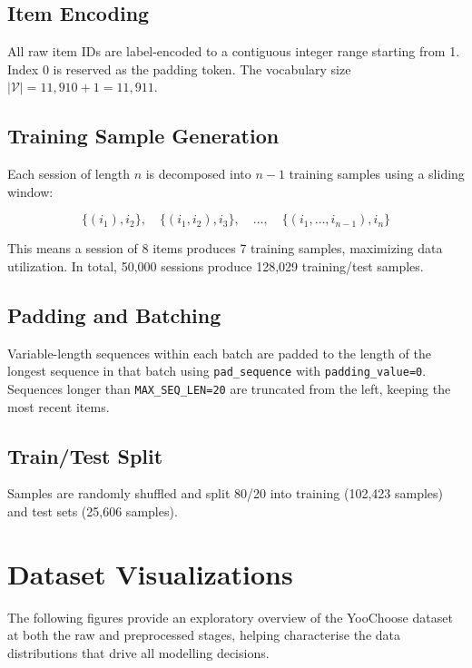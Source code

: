 \documentclass[12pt,a4paper]{report}
\begin{document}
\subsection{Item Encoding}

All raw item IDs are label-encoded to a contiguous integer range starting from 1.
Index 0 is reserved as the padding token. The vocabulary size
$|\mathcal{V}| = 11{,}910 + 1 = 11{,}911$.

\subsection{Training Sample Generation}

Each session of length $n$ is decomposed into $n-1$ training samples using a
sliding window:

\begin{equation}
\{(i_1), i_2\}, \quad \{(i_1, i_2), i_3\}, \quad \ldots, \quad \{(i_1, \ldots, i_{n-1}), i_n\}
\end{equation}

This means a session of 8 items produces 7 training samples, maximizing data
utilization. In total, 50,000 sessions produce 128,029 training/test samples.

\subsection{Padding and Batching}

Variable-length sequences within each batch are padded to the length of the
longest sequence in that batch using \texttt{pad\_sequence} with
\texttt{padding\_value=0}. Sequences longer than \texttt{MAX\_SEQ\_LEN=20} are
truncated from the left, keeping the most recent items.

\subsection{Train/Test Split}

Samples are randomly shuffled and split 80/20 into training (102,423 samples)
and test sets (25,606 samples).

\section{Dataset Visualizations}

The following figures provide an exploratory overview of the YooChoose dataset
at both the raw and preprocessed stages, helping characterise the data
distributions that drive all modelling decisions.
\end{document}
